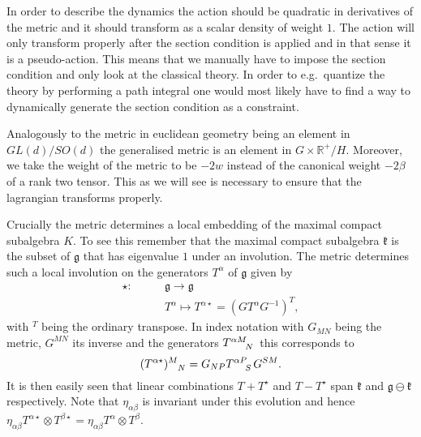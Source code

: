 In order to describe the dynamics the action should be quadratic in derivatives of the metric and it should transform as a scalar density of weight $1$. The action will only transform properly after the section condition is applied and in that sense it is a pseudo-action. This means that we manually have to impose the section condition and only look at the classical theory. In order to e.g.\ quantize the theory by performing a path integral one would most likely have to find a way to dynamically generate the section condition as a constraint. 

Analogously to the metric in euclidean geometry being an element in $GL(d)/SO(d)$ the generalised metric is an element in $G\times \mathbb{R}^+/H$. Moreover, we take the weight of the metric to be $-2w$ instead of the canonical weight $-2\beta$ of a rank two tensor. This as we will see is necessary to ensure that the lagrangian transforms properly. 


Crucially the metric determines a local embedding of the maximal compact subalgebra $K$. To see this remember that the maximal compact subalgebra $\mathfrak{k}$ is the subset of $\mathfrak{g}$ that has eigenvalue $1$ under an involution. The metric determines such a local involution on the generators $T^\alpha$ of $\mathfrak{g}$ given by 
\begin{equation}
    \begin{aligned}
    \star:\qquad &\mathfrak{g}\to\mathfrak{g}\\
           &T^\alpha \mapsto T^{\alpha \star} = (GT^\alpha G^{-1})^T,
    \end{aligned}
\end{equation}
with $^T$ being the ordinary transpose. In index notation with $G_{MN}$ being the metric, $G^{MN}$ its inverse and the generators $\tensor{T}{^{\alpha M}_N}$ this corresponds to 
\begin{equation}
    (\tensor{T}{^{\alpha\star}})\tensor{}{^M_N} = G_{NP}\tensor{T}{^{\alpha P}_S}G^{SM}.
\end{equation}
It is then easily seen that linear combinations $T+T^\star$ and $T-T^\star$ span $\mathfrak{k}$ and $\mathfrak{g}\ominus\mathfrak{k}$ respectively. Note that $\eta_{\alpha\beta}$ is invariant under this evolution and hence $\eta_{\alpha\beta}T^{\alpha\star}\otimes T^{\beta\star}=\eta_{\alpha\beta}T^{\alpha}\otimes T^{\beta}$.

